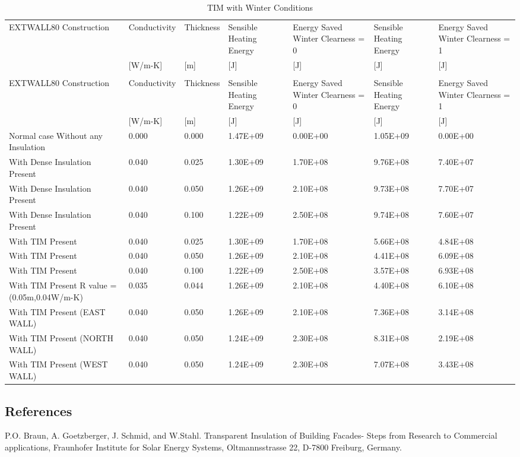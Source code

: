 {\scriptsize
\begin{longtable}[c]{p{1.0in}p{0.75in}p{0.75in}p{0.75in}p{0.75in}p{0.75in}p{0.75in}}
\caption{TIM with Winter Conditions \label{table:tim-with-winter-conditions-000}} \tabularnewline
\toprule 
EXTWALL80 Construction & Conductivity & Thickness & Sensible Heating Energy & Energy Saved Winter Clearness = 0 & Sensible Heating Energy & Energy Saved Winter Clearness = 1 \tabularnewline
~ & [W/m-K] & [m] & [J] & [J] & [J] & [J] \tabularnewline
\midrule
\endfirsthead

\caption[]{TIM with Winter Conditions} \tabularnewline
\toprule 
EXTWALL80 Construction & Conductivity & Thickness & Sensible Heating Energy & Energy Saved Winter Clearness = 0 & Sensible Heating Energy & Energy Saved Winter Clearness = 1 \tabularnewline
~ & [W/m-K] & [m] & [J] & [J] & [J] & [J] \tabularnewline
\midrule
\endhead

Normal case Without any Insulation & 0.000 & 0.000 & 1.47E+09 & 0.00E+00 & 1.05E+09 & 0.00E+00 \tabularnewline
With Dense Insulation Present & 0.040 & 0.025 & 1.30E+09 & 1.70E+08 & 9.76E+08 & 7.40E+07 \tabularnewline
With Dense Insulation Present & 0.040 & 0.050 & 1.26E+09 & 2.10E+08 & 9.73E+08 & 7.70E+07 \tabularnewline
With Dense Insulation Present & 0.040 & 0.100 & 1.22E+09 & 2.50E+08 & 9.74E+08 & 7.60E+07 \tabularnewline
With TIM Present & 0.040 & 0.025 & 1.30E+09 & 1.70E+08 & 5.66E+08 & 4.84E+08 \tabularnewline
With TIM Present & 0.040 & 0.050 & 1.26E+09 & 2.10E+08 & 4.41E+08 & 6.09E+08 \tabularnewline
With TIM Present & 0.040 & 0.100 & 1.22E+09 & 2.50E+08 & 3.57E+08 & 6.93E+08 \tabularnewline
With TIM Present R value = (0.05m,0.04W/m-K) & 0.035 & 0.044 & 1.26E+09 & 2.10E+08 & 4.40E+08 & 6.10E+08 \tabularnewline
With TIM Present (EAST WALL) & 0.040 & 0.050 & 1.26E+09 & 2.10E+08 & 7.36E+08 & 3.14E+08 \tabularnewline
With TIM Present (NORTH WALL) & 0.040 & 0.050 & 1.24E+09 & 2.30E+08 & 8.31E+08 & 2.19E+08 \tabularnewline
With TIM Present (WEST WALL) & 0.040 & 0.050 & 1.24E+09 & 2.30E+08 & 7.07E+08 & 3.43E+08 \tabularnewline
\bottomrule
\end{longtable}}

\subsection{References}\label{references-046}

P.O. Braun, A. Goetzberger, J. Schmid, and W.Stahl. Transparent Insulation of Building Facades- Steps from Research to Commercial applications, Fraunhofer Institute for Solar Energy Systems, Oltmannsstrasse 22, D-7800 Freiburg, Germany.

